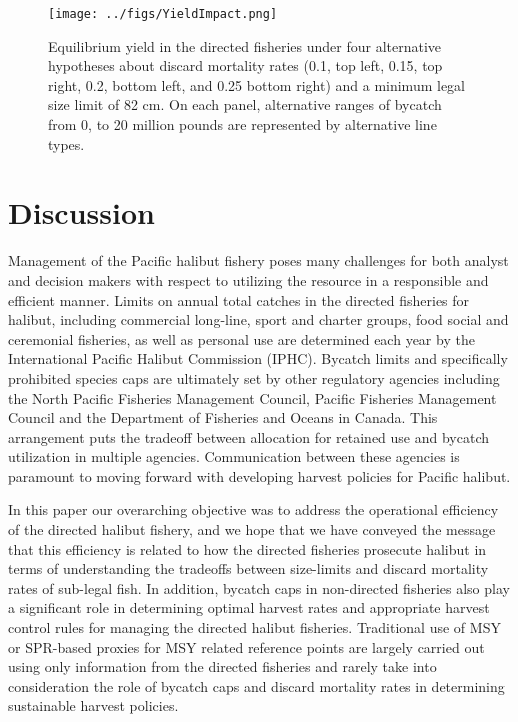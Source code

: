 \documentclass[12pt,leqno]{article}
\begin{document}
\begin{figure}
	\texttt{[image: ../figs/YieldImpact.png]}
	\caption{Equilibrium yield in the directed fisheries under four alternative hypotheses about discard mortality rates (0.1, top left, 0.15, top right, 0.2, bottom left, and 0.25 bottom right) and a minimum legal size limit of 82 cm. On each panel, alternative ranges of bycatch from 0, to 20 million pounds are represented by alternative line types.}\label{fig:YieldImpact}
\end{figure}


\section*{Discussion}

Management of the Pacific halibut fishery poses many challenges for both analyst and decision makers with respect to utilizing the resource in a responsible and efficient manner.  Limits on annual total catches in the directed fisheries for halibut, including commercial long-line, sport and charter groups, food social and ceremonial fisheries, as well as personal use are determined each year by the International Pacific Halibut Commission (IPHC).  Bycatch limits and specifically prohibited species caps are ultimately set by other regulatory agencies including the North Pacific Fisheries Management Council, Pacific Fisheries Management Council and the Department of Fisheries and Oceans in Canada.  This arrangement puts the tradeoff between allocation for retained use and bycatch utilization in multiple agencies. Communication between these agencies is paramount to moving forward with developing harvest policies for Pacific halibut.

In this paper our overarching objective was to address the operational efficiency of the directed halibut fishery, and we hope that we have conveyed the message that this efficiency is related to  how the directed fisheries prosecute halibut in terms of understanding the tradeoffs between size-limits and  discard mortality rates of sub-legal fish.  In addition, bycatch caps in non-directed fisheries also play a significant role in determining optimal harvest rates and appropriate harvest control rules for managing the directed halibut fisheries.  Traditional use of MSY or SPR-based proxies for MSY related reference points are largely carried out using only information from the directed fisheries and rarely take into consideration the role of bycatch caps and discard mortality rates in determining sustainable harvest policies.
\end{document}
